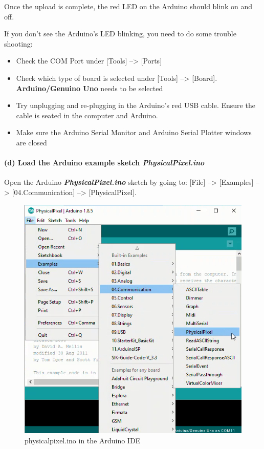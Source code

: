 Once the upload is complete, the red LED on the Arduino should blink on
and off.

If you don't see the Arduino's LED blinking, you need to do some trouble
shooting:

\begin{itemize}
\tightlist
\item
  Check the COM Port under {[}Tools{]} --\textgreater{} {[}Ports{]}
\item
  Check which type of board is selected under {[}Tools{]}
  --\textgreater{} {[}Board{]}. \textbf{Arduino/Genuino Uno} needs to be
  selected
\item
  Try unplugging and re-plugging in the Arduino's red USB cable. Ensure
  the cable is seated in the computer and Arduino.
\item
  Make sure the Arduino Serial Monitor and Arduino Serial Plotter
  windows are closed
\end{itemize}

    \hypertarget{d-load-the-arduino-example-sketch-physicalpixel.ino}{%
\paragraph{\texorpdfstring{(d) Load the Arduino example sketch
\textbf{\emph{PhysicalPixel.ino}}}{(d) Load the Arduino example sketch PhysicalPixel.ino}}\label{d-load-the-arduino-example-sketch-physicalpixel.ino}}

Open the Arduino \textbf{\emph{PhysicalPixel.ino}} sketch by going to:
{[}File{]} --\textgreater{} {[}Examples{]} --\textgreater{}
{[}04.Communication{]} --\textgreater{} {[}PhysicalPixel{]}.

\begin{figure}[h!]
\centering
\includegraphics{images/examples_com_physicalpixel.png}
\caption{physicalpixel.ino in the Arduino IDE}
\end{figure}

